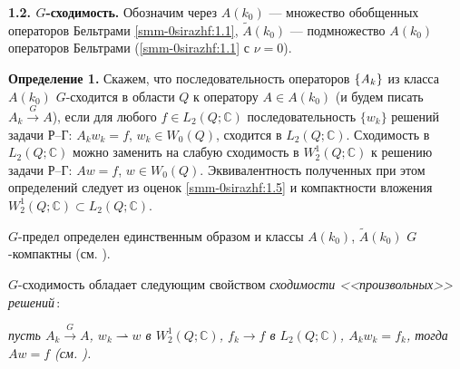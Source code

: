 \documentclass[a4paper,12pt]{article}
\theoremstyle{definition}
\begin{document}
\smallskip

\textbf{1.2. $G$-сходимость.}
Обозначим через $A(k_0)$ --- множество обобщенных  операторов Бельтрами
\eqref{smm-0sirazhf:1.1}, $\tilde{A}(k_0)$ --- подмножество $A(k_0)$  операторов Бельтрами
(\eqref{smm-0sirazhf:1.1} с $\nu=0$).

\smallskip
\textbf{Определение 1.}
Скажем, что последовательность операторов $\left\{ {\it A}_k\right\}$ из класса $A(k_0)$
$G$-сходится в области $Q$ к оператору $A\in A(k_0)$
(и будем писать $A_k\overset{G}{\longrightarrow} A$),
если для любого $f\in L_2(Q;\mathbb{C})$ последовательность $\{w_k\}$ решений задачи Р--Г: $A_kw_k=f$, $w_k\in W_0(Q)$,
сходится в $L_2(Q;\mathbb{C})$. Сходимость в
$L_2(Q;\mathbb{C})$ можно заменить на слабую сходимость в
$W_2^1(Q;\mathbb{C})$ к решению задачи Р--Г: $Aw=f$, $w\in W_0(Q)$. Эквивалентность полученных при этом определений следует из оценок \eqref{smm-0sirazhf:1.5} и компактности вложения
$W_2^1(Q;\mathbb{C})\subset L_2(Q;\mathbb{C})$.

\smallskip
$G$-предел определен единственным образом и
классы $A(k_0)$, $\tilde{A}(k_0)$
$G$-компактны (см. \cite{smm-11}).

$G$-сходимость обладает следующим свойством \textit{сходимости <<произвольных>>  решений\,}:

\noindent\textit{пусть $A_k\overset{G}{\longrightarrow} A$, $w_k\rightharpoonup w$ в $W_2^1(Q;\mathbb{C})$, $f_k\to f$ в $L_2(Q;\mathbb{C})$,
	$A_kw_k=f_k$, тогда $Aw=f$ {\rm(см. \cite{smm-11})}.}
\smallskip
\end{document}
